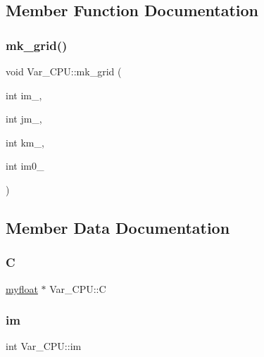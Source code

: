 \subsection{Member Function Documentation}
\mbox{\label{classVar__CPU_a61a81776421804e9dc2a8e2c3b7cc2de}} 
\subsubsection{\texorpdfstring{mk\+\_\+grid()}{mk\_grid()}}
{\footnotesize\ttfamily void Var\+\_\+\+C\+P\+U\+::mk\+\_\+grid (\begin{DoxyParamCaption}\item[{int}]{im\+\_\+,  }\item[{int}]{jm\+\_\+,  }\item[{int}]{km\+\_\+,  }\item[{int}]{im0\+\_\+ }\end{DoxyParamCaption})\hspace{0.3cm}{\ttfamily [inline]}}



\subsection{Member Data Documentation}
\mbox{\label{classVar__CPU_a9f9dcf8862d19503f7ed275246cb4b84}} 
\subsubsection{\texorpdfstring{C}{C}}
{\footnotesize\ttfamily \hyperlink{param_8h_a5f097c9f3873af7be7fc156e6a06ca5e}{myfloat} $\ast$ Var\+\_\+\+C\+P\+U\+::C}

\mbox{\label{classVar__CPU_a5c3a4805c272c3f25a90cbec36332cbe}} 
\subsubsection{\texorpdfstring{im}{im}}
{\footnotesize\ttfamily int Var\+\_\+\+C\+P\+U\+::im}

